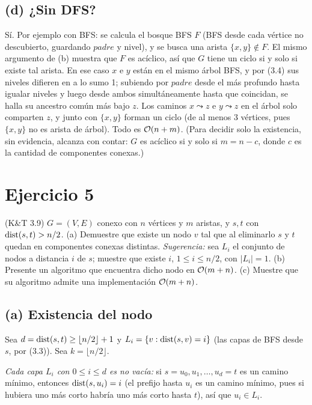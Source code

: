 \subsection*{(d) ¿Sin DFS?}
Sí. Por ejemplo con BFS: se calcula el bosque BFS $F$ (BFS desde cada vértice no descubierto, guardando
$padre$ y nivel), y se busca una arista $\{x,y\}\notin F$. El mismo argumento de (b) muestra que $F$
es acíclico, así que $G$ tiene un ciclo si y solo si existe tal arista. En ese caso $x$ e $y$ están en
el mismo árbol BFS, y por (3.4) sus niveles difieren en a lo sumo 1; subiendo por $padre$ desde el más
profundo hasta igualar niveles y luego desde ambos simultáneamente hasta que coincidan, se halla su
ancestro común más bajo $z$. Los caminos $x\leadsto z$ e $y\leadsto z$ en el árbol solo comparten $z$, y
junto con $\{x,y\}$ forman un ciclo (de al menos 3 vértices, pues $\{x,y\}$ no es arista de árbol).
Todo es $\mathcal{O}(n+m)$. (Para decidir solo la existencia, sin evidencia, alcanza con contar: $G$ es acíclico
si y solo si $m=n-c$, donde $c$ es la cantidad de componentes conexas.)

\section{Ejercicio 5}
\begin{enunciado}
(K\&T 3.9) $G=(V,E)$ conexo con $n$ vértices y $m$ aristas, y $s,t$ con $\mathrm{dist}(s,t)>n/2$.
(a) Demuestre que existe un nodo $v$ tal que al eliminarlo $s$ y $t$ quedan en componentes conexas
distintas. \emph{Sugerencia:} sea $L_i$ el conjunto de nodos a distancia $i$ de $s$; muestre que
existe $i$, $1\le i\le n/2$, con $|L_i|=1$.
(b) Presente un algoritmo que encuentra dicho nodo en $\mathcal{O}(m+n)$.
(c) Muestre que su algoritmo admite una implementación $\mathcal{O}(m+n)$.
\end{enunciado}

\subsection*{(a) Existencia del nodo}
Sea $d=\mathrm{dist}(s,t)\ge\lfloor n/2\rfloor+1$ y $L_i=\{v:\mathrm{dist}(s,v)=i\}$ (las capas de BFS desde $s$, por
(3.3)). Sea $k=\lfloor n/2\rfloor$.

\emph{Cada capa $L_i$ con $0\le i\le d$ es no vacía:} si $s=u_0,u_1,\dots,u_d=t$ es un camino mínimo,
entonces $\mathrm{dist}(s,u_i)=i$ (el prefijo hasta $u_i$ es un camino mínimo, pues si hubiera uno más corto
habría uno más corto hasta $t$), así que $u_i\in L_i$.

